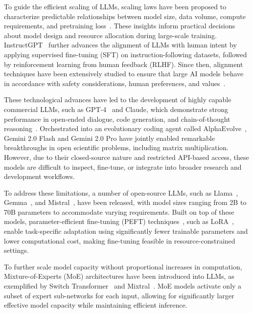\documentclass[10pt, a4paper, logo, copyright]{googledeepmind} %
\begin{document}
To guide the efficient scaling of LLMs, scaling laws have been proposed to characterize predictable relationships between model size, data volume, compute requirements, and pretraining loss~\cite{kaplan2020scaling, hoffmann2022training}. These insights inform practical decisions about model design and resource allocation during large-scale training. InstructGPT~\cite{ouyang2022training} further advances the alignment of LLMs with human intent by applying supervised fine-tuning (SFT) on instruction-following datasets, followed by reinforcement learning from human feedback (RLHF). Since then, alignment techniques have been extensively studied to ensure that large AI models behave in accordance with safety considerations, human preferences, and values~\cite{ji2023ai}.

These technological advances have led to the development of highly capable commercial LLMs, such as GPT-4~\cite{achiam2023gpt} and Claude, which demonstrate strong performance in open-ended dialogue, code generation, and chain-of-thought reasoning~\cite{wei2022chain}. Orchestrated into an evolutionary coding agent called AlphaEvolve~\cite{novikov2025alphaevolve}, Gemini 2.0 Flash and Gemini 2.0 Pro have jointly enabled remarkable breakthroughs in open scientific problems, including matrix multiplication. However, due to their closed-source nature and restricted API-based access, these models are difficult to inspect, fine-tune, or integrate into broader research and development workflows.

To address these limitations, a number of open-source LLMs, such as Llama~\cite{touvron2023llama, touvron2023llama2, grattafiori2024llama}, Gemma~\cite{team2024gemma, team2024gemma2, team2025gemma}, and Mistral~\cite{jiang2023mistral7b}, have been released, with model sizes ranging from 2B to 70B parameters to accommodate varying requirements. Built on top of these models, parameter-efficient fine-tuning (PEFT) techniques~\cite{li2021prefix, liu2024gpt, liu2021p, lester2021power, houlsby2019parameter, dettmers2023qlora}, such as LoRA~\cite{hu2022lora}, enable task-specific adaptation using significantly fewer trainable parameters and lower computational cost, making fine-tuning feasible in resource-constrained settings.

To further scale model capacity without proportional increases in computation, Mixture-of-Experts (MoE) architectures have been introduced into LLMs, as exemplified by Switch Transformer~\cite{fedus2022switch} and Mixtral~\cite{jiang2024mixtral}. MoE models activate only a subset of expert sub-networks for each input, allowing for significantly larger effective model capacity while maintaining efficient inference.
\end{document}
